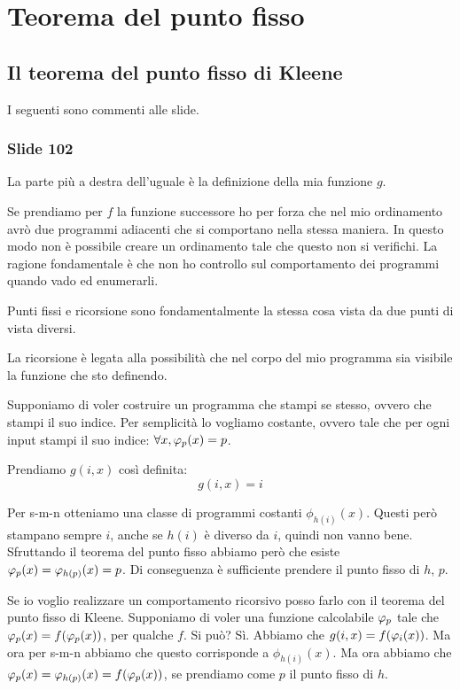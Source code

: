 \chapter{Teorema del punto fisso}

\section{Il teorema del punto fisso di Kleene}

I seguenti sono commenti alle slide.

\subsection{Slide 102}

La parte più a destra dell'uguale è la definizione della mia funzione $g$.

Se prendiamo per $f$ la funzione successore ho per forza che nel mio ordinamento avrò due programmi
adiacenti che si comportano nella stessa maniera. In questo modo non è possibile creare un
ordinamento tale che questo non si verifichi. La ragione fondamentale è che non ho controllo sul
comportamento dei programmi quando vado ed enumerarli.

Punti fissi e ricorsione sono fondamentalmente la stessa cosa vista da due punti di vista diversi.

La ricorsione è legata alla possibilità che nel corpo del mio programma sia visibile la funzione
che sto definendo.

Supponiamo di voler costruire un programma che stampi se stesso, ovvero che stampi il suo indice.
Per semplicità lo vogliamo costante, ovvero tale che per ogni input stampi il suo indice: $\forall
x, \varphi_{p}(x) = p$.

Prendiamo $g(i,x)$ così definita:
\begin{equation*}
    g(i,x) = i
\end{equation*}

Per s-m-n otteniamo una classe di programmi costanti $\phi_{h(i)}(x)$. Questi però stampano sempre
$i$, anche se $h(i)$ è diverso da $i$, quindi non vanno bene. Sfruttando il teorema del punto fisso
abbiamo però che esiste $\varphi_{p}(x) = \varphi_{h(p)}(x) = p$. Di conseguenza è sufficiente prendere il
punto fisso di $h$, $p$.

Se io voglio realizzare un comportamento ricorsivo posso farlo con il teorema del punto fisso di
Kleene. Supponiamo di voler una funzione calcolabile $\varphi_{p}$ tale che $\varphi_{p}(x) = f(\varphi_{p}(x))$, per
qualche $f$. Si può? Sì. Abbiamo che $g(i,x) = f(\varphi_{i}(x))$. Ma ora per s-m-n abbiamo che questo
corrisponde a $\phi_{h(i)}(x)$. Ma ora abbiamo che $\varphi_{p}(x) = \varphi_{h(p)}(x) = f(\varphi_{p}(x))$, se
prendiamo come $p$ il punto fisso di $h$.

